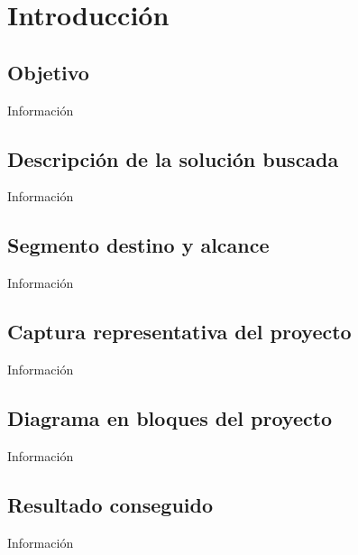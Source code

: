 \chapter{Introducción}
    \section{Objetivo}
        Información\par
    
    \section{Descripción de la solución buscada}
        Información\par
    
    \section{Segmento destino y alcance}
        Información\par
    
    \section{Captura representativa del proyecto}
        Información\par
    
    \section{Diagrama en bloques del proyecto}
        Información
    
    \section{Resultado conseguido}
        Información